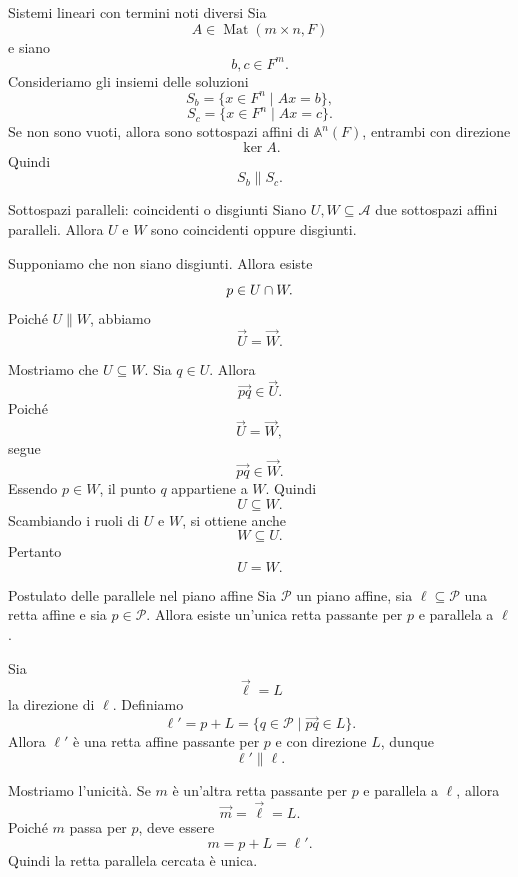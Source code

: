 \documentclass[a4paper]{article}
\begin{document}
\begin{snippetexample}{Sistemi lineari con termini noti diversi}
    Sia
    \[
        A\in\operatorname{Mat}(m\times n,F)
    \]
    e siano
    \[
        b,c\in F^m.
    \]
    Consideriamo gli insiemi delle soluzioni
    \[
        S_b=\{x\in F^n\mid Ax=b\},
    \]
    \[
        S_c=\{x\in F^n\mid Ax=c\}.
    \]
    Se non sono vuoti, allora sono sottospazi affini di \(\mathbb{A}^n(F)\), entrambi con direzione
    \[
        \ker A.
    \]
    Quindi
    \[
        S_b\parallel S_c.
    \]
\end{snippetexample}

\begin{snippetproposition}{Sottospazi paralleli: coincidenti o disgiunti}
    Siano \(U,W\subseteq\mathcal{A}\) due sottospazi affini paralleli. Allora \(U\) e \(W\) sono coincidenti oppure disgiunti.
\end{snippetproposition}

\begin{snippetproof}{}
    Supponiamo che non siano disgiunti. Allora esiste
    \[
        p\in U\cap W.
    \]
    Poiché \(U\parallel W\), abbiamo
    \[
        \overrightarrow{U}=\overrightarrow{W}.
    \]

    Mostriamo che \(U\subseteq W\). Sia \(q\in U\). Allora
    \[
        \overrightarrow{pq}\in\overrightarrow{U}.
    \]
    Poiché
    \[
        \overrightarrow{U}=\overrightarrow{W},
    \]
    segue
    \[
        \overrightarrow{pq}\in\overrightarrow{W}.
    \]
    Essendo \(p\in W\), il punto \(q\) appartiene a \(W\). Quindi
    \[
        U\subseteq W.
    \]
    Scambiando i ruoli di \(U\) e \(W\), si ottiene anche
    \[
        W\subseteq U.
    \]
    Pertanto
    \[
        U=W.
    \]
\end{snippetproof}

\begin{snippetproposition}{Postulato delle parallele nel piano affine}
    Sia \(\mathcal{P}\) un piano affine, sia \(\ell\subseteq\mathcal{P}\) una retta affine e sia \(p\in\mathcal{P}\). Allora esiste un'unica retta passante per \(p\) e parallela a \(\ell\).
\end{snippetproposition}

\begin{snippetproof}{}
    Sia
    \[
        \overrightarrow{\ell}=L
    \]
    la direzione di \(\ell\). Definiamo
    \[
        \ell'
        =
        p+L
        =
        \{q\in\mathcal{P}\mid \overrightarrow{pq}\in L\}.
    \]
    Allora \(\ell'\) è una retta affine passante per \(p\) e con direzione \(L\), dunque
    \[
        \ell'\parallel \ell.
    \]

    Mostriamo l'unicità. Se \(m\) è un'altra retta passante per \(p\) e parallela a \(\ell\), allora
    \[
        \overrightarrow{m}=\overrightarrow{\ell}=L.
    \]
    Poiché \(m\) passa per \(p\), deve essere
    \[
        m=p+L=\ell'.
    \]
    Quindi la retta parallela cercata è unica.
\end{snippetproof}
\end{document}
